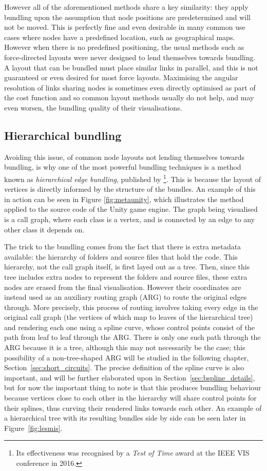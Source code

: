 However all of the aforementioned methods share a key similarity: they apply bundling upon the assumption that node positions are predetermined and will not be moved. This is perfectly fine and even desirable in many common use cases where nodes have a predefined location, such as geographical maps. However when there is no predefined positioning, the usual methods such as force-directed layouts were never designed to lend themselves towards bundling. A layout that can be bundled must place similar links in parallel, and this is not guaranteed or even desired for most force layouts. Maximising the angular resolution of links sharing nodes is sometimes even directly optimised as part of the cost function \citep{Argyriou2010} and so common layout methods usually do not help, and may even worsen, the bundling quality of their visualisations.

\subsection{Hierarchical bundling}
\label{sec:heb_background}
Avoiding this issue, of common node layouts not lending themselves towards bundling, is why one of the most powerful bundling techniques is a method known as \emph{hierarchical edge bundling}, published by \citet{Holten2006}\footnote{Its effectiveness was recognised by a \emph{Test of Time} award at the IEEE VIS conference in 2016.}. This is because the layout of vertices is directly informed by the structure of the bundles.
An example of this in action can be seen in Figure \ref{fig:metaunity}, which illustrates the method applied to the source code of the Unity game engine. The graph being visualised is a call graph, where each class is a vertex, and is connected by an edge to any other class it depends on. 

The trick to the bundling comes from the fact that there is extra metadata available: the hierarchy of folders and source files that hold the code.
This hierarchy, not the call graph itself, is first layed out as a tree. Then, since this tree includes extra nodes to represent the folders and source files, these extra nodes are erased from the final visualisation. However their coordinates are instead used as an auxiliary routing graph (ARG) to route the original edges through.
More precisely, this process of routing involves taking every edge in the original call graph (the vertices of which map to leaves of the hierarchical tree) and rendering each one using a spline curve, whose control points consist of the path from leaf to leaf through the ARG. There is only one such path through the ARG because it is a tree, although this may not necessarily be the case; this possibility of a non-tree-shaped ARG will be studied in the following chapter, Section~\ref{sec:short_circuits}. The precise definition of the spline curve is also important, and will be further elaborated upon in Section~\ref{sec:bspline_details}, but for now the important thing to note is that this produces bundling behaviour because vertices close to each other in the hierarchy will share control points for their splines, thus curving their rendered links towards each other.
An example of a hierarchical tree with its resulting bundles side by side can be seen later in Figure~\ref{fig:lesmis}.

